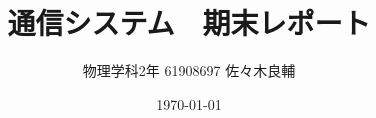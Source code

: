 \documentclass[uplatex,a4j,11pt, titlepage]{jsarticle}
\begin{document}
\title{通信システム　期末レポート}
\author{物理学科2年 61908697 佐々木良輔}
\date{\today}
\maketitle






\end{document}
